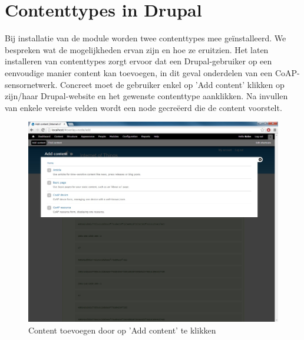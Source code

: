 \section{Contenttypes in Drupal}

Bij installatie van de module worden twee contenttypes mee ge\"{i}nstalleerd. We bespreken wat de mogelijkheden ervan zijn en hoe ze eruitzien. Het laten installeren van contenttypes zorgt ervoor dat een Drupal-gebruiker op een eenvoudige manier content kan toevoegen, in dit geval onderdelen van een CoAP-sensornetwerk. Concreet moet de gebruiker enkel op 'Add content' klikken op zijn/haar Drupal-website en het gewenste contenttype aanklikken. Na invullen van enkele vereiste velden wordt een node gecre\"{e}erd die de content voorstelt.
\begin{figure}[h!]
\vspace{10pt}
\centering
\includegraphics[width=1\textwidth]{fig/add_content}
\caption{Content toevoegen door op 'Add content' te klikken}
\label{fig:addContent}
\end{figure}

